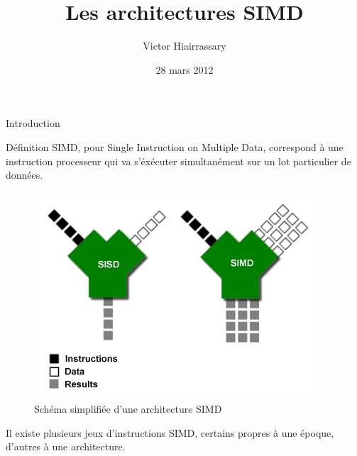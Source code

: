 \documentclass{beamer}
\title{Les architectures SIMD}
\author{Victor Hiairrassary}
\institute{Polytech' Montpellier}
\date{28 mars 2012}
\begin{document}
\small 


\begin{frame}
    \titlepage
\end{frame}


\begin{frame}{Introduction}
    \begin{block}{Définition}
    SIMD, pour Single Instruction on Multiple Data, correspond à une instruction
    processeur qui va s'éxécuter simultanément sur un lot particulier de données.
    \end{block}

    \begin{figure}
    \begin{center}
        \includegraphics[scale=0.3]{simd.png}
    \end{center}
     \caption{Schéma simplifiée d'une architecture SIMD}
    \end{figure}

    \begin{block}{}
    Il existe plusieurs jeux d'instructions SIMD, certains propres à une époque, 
    d'autres à une architecture.
    \end{block}
\end{frame}
\end{document}
